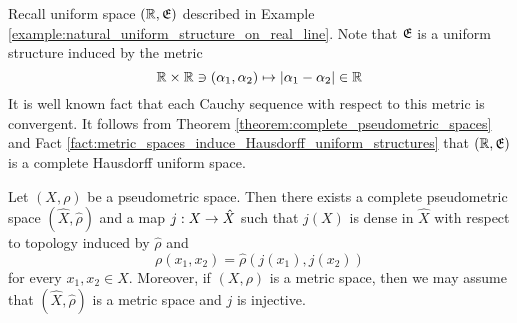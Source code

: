 \begin{example}\label{example:real_line_is_complete}
Recall uniform space $\left({\mathbb R},{\mathfrak E}\right)$ described in Example \ref{example:natural_uniform_structure_on_real_line}. Note that ${\mathfrak E}$ is a uniform structure induced by the metric
$${\mathbb R}\times {\mathbb R}\ni (\alpha_1,\alpha_2) \mapsto |\alpha_1 - \alpha_2|\in {\mathbb R}$$
It is well known fact that each Cauchy sequence with respect to this metric is convergent. It follows from Theorem \ref{theorem:complete_pseudometric_spaces} and Fact \ref{fact:metric_spaces_induce_Hausdorff_uniform_structures} that $\left({\mathbb R},{\mathfrak E}\right)$ is a complete Hausdorff uniform space.
\end{example}

\begin{theorem}\label{theorem:completion_of_a_pseudometric_space}
Let $(X,\rho)$ be a pseudometric space. Then there exists a complete pseudometric space $(\hat{X},\hat{\rho})$ and a map $j:X\rightarrow \hat{X}$ such that $j(X)$ is dense in $\hat{X}$ with respect to topology induced by $\hat{\rho}$ and
$$\rho(x_1,x_2) = \hat{\rho}(j(x_1),j(x_2))$$
for every $x_1,x_2\in X$. Moreover, if $(X,\rho)$ is a metric space, then we may assume that $(\hat{X},\hat{\rho})$ is a metric space and $j$ is injective.
\end{theorem}
